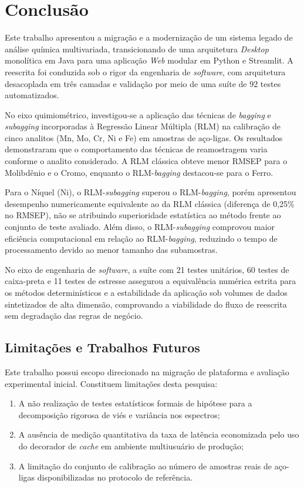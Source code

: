 \chapter{Conclusão}
\label{sec:conclusao}

Este trabalho apresentou a migração e a modernização de um sistema legado de análise química multivariada, transicionando de uma arquitetura \textit{Desktop} monolítica em Java para uma aplicação \textit{Web} modular em Python e Streamlit. A reescrita foi conduzida sob o rigor da engenharia de \textit{software}, com arquitetura desacoplada em três camadas e validação por meio de uma suíte de 92 testes automatizados.

No eixo quimiométrico, investigou-se a aplicação das técnicas de \textit{bagging} e \textit{subagging} incorporadas à Regressão Linear Múltipla (RLM) na calibração de cinco analitos (Mn, Mo, Cr, Ni e Fe) em amostras de aço-ligas. Os resultados demonstraram que o comportamento das técnicas de reamostragem varia conforme o analito considerado. A RLM clássica obteve menor RMSEP para o Molibdênio e o Cromo, enquanto o RLM-\textit{bagging} destacou-se para o Ferro.

Para o Níquel (Ni), o RLM-\textit{subagging} superou o RLM-\textit{bagging}, porém apresentou desempenho numericamente equivalente ao da RLM clássica (diferença de 0,25\% no RMSEP), não se atribuindo superioridade estatística ao método frente ao conjunto de teste avaliado. Além disso, o RLM-\textit{subagging} comprovou maior eficiência computacional em relação ao RLM-\textit{bagging}, reduzindo o tempo de processamento devido ao menor tamanho das subamostras.

No eixo de engenharia de \textit{software}, a suíte com 21 testes unitários, 60 testes de caixa-preta e 11 testes de estresse assegurou a equivalência numérica estrita para os métodos determinísticos e a estabilidade da aplicação sob volumes de dados sintetizados de alta dimensão, comprovando a viabilidade do fluxo de reescrita sem degradação das regras de negócio.

\section{Limitações e Trabalhos Futuros}
\label{sec:limitacoes}

Este trabalho possui escopo direcionado na migração de plataforma e avaliação experimental inicial. Constituem limitações desta pesquisa:
\begin{enumerate}[label=\alph*)]
    \item A não realização de testes estatísticos formais de hipótese para a decomposição rigorosa de viés e variância nos espectros;
    \item A ausência de medição quantitativa da taxa de latência economizada pelo uso do decorador de \textit{cache} em ambiente multiusuário de produção;
    \item A limitação do conjunto de calibração ao número de amostras reais de aço-ligas disponibilizadas no protocolo de referência.
\end{enumerate}

